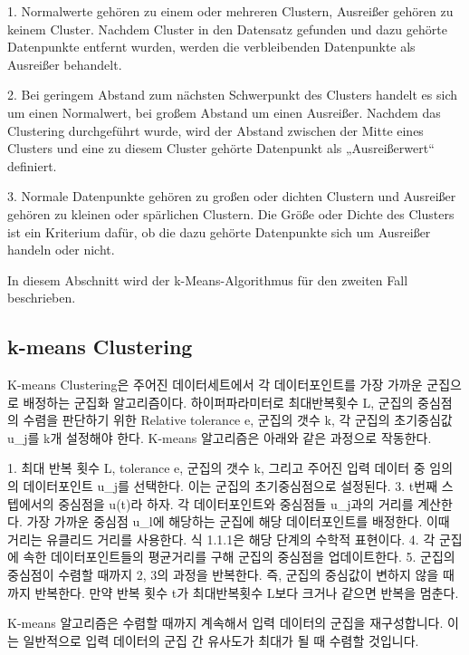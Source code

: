                 1. Normalwerte gehören zu einem oder mehreren Clustern, Ausreißer gehören zu keinem Cluster.
                    Nachdem Cluster in den Datensatz gefunden und dazu gehörte Datenpunkte entfernt wurden, werden die verbleibenden Datenpunkte als Ausreißer behandelt.

                2. Bei geringem Abstand zum nächsten Schwerpunkt des Clusters handelt es sich um einen Normalwert, bei großem Abstand um einen Ausreißer.
                    Nachdem das Clustering durchgeführt wurde, wird der Abstand zwischen der Mitte eines Clusters und eine zu diesem Cluster gehörte Datenpunkt als „Ausreißerwert“ definiert.

                3. Normale Datenpunkte gehören zu großen oder dichten Clustern und Ausreißer gehören zu kleinen oder spärlichen Clustern.
                    Die Größe oder Dichte des Clusters ist ein Kriterium dafür, ob die dazu gehörte Datenpunkte sich um Ausreißer handeln oder nicht.

            In diesem Abschnitt wird der k-Means-Algorithmus für den zweiten Fall beschrieben.
            
            \subsection{k-means Clustering}
                K-means Clustering은 주어진 데이터세트에서 각 데이터포인트를 가장 가까운 군집으로 배정하는 군집화 알고리즘이다. 하이퍼파라미터로 최대반복횟수 L, 군집의 중심점의 수렴을 판단하기 위한 Relative tolerance e, 군집의 갯수 k, 각 군집의 초기중심값 u_j를 k개 설정해야 한다. K-means 알고리즘은 아래와 같은 과정으로 작동한다.
                
                1. 최대 반복 횟수 L, tolerance e, 군집의 갯수 k, 그리고 주어진 입력 데이터 중 임의의 데이터포인트 u_j를 선택한다. 이는 군집의 초기중심점으로 설정된다.
                3. t번째 스텝에서의 중심점을 u(t)라 하자. 각 데이터포인트와 중심점들 u_j과의 거리를 계산한다. 가장 가까운 중심점 u_l에 해당하는 군집에 해당 데이터포인트를 배정한다. 이때 거리는 유클리드 거리를 사용한다. 식 1.1.1은 해당 단계의 수학적 표현이다.
                4. 각 군집에 속한 데이터포인트들의 평균거리를 구해 군집의 중심점을 업데이트한다.
                5. 군집의 중심점이 수렴할 때까지 2, 3의 과정을 반복한다. 즉, 군집의 중심값이 변하지 않을 때까지 반복한다. 만약 반복 횟수 t가 최대반복횟수 L보다 크거나 같으면 반복을 멈춘다.

                K-means 알고리즘은 수렴할 때까지 계속해서 입력 데이터의 군집을 재구성합니다. 이는 일반적으로 입력 데이터의 군집 간 유사도가 최대가 될 때 수렴할 것입니다.

